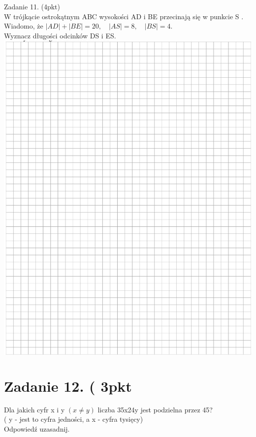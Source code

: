 \documentclass[10pt]{article}
\begin{document}
Zadanie 11. (4pkt)\\
W trójkącie ostrokątnym ABC wysokości AD i BE przecinają się w punkcie S .\\
Wiadomo, że \(|A D|+|B E|=20, \quad|A S|=8, \quad|B S|=4\).\\
Wyznacz długości odcinków DS i ES.\\
\includegraphics[max width=\textwidth, center]{2024_11_21_439e1d90cd1e7f928ae2g-09}

\section*{Zadanie 12. ( 3pkt}
Dla jakich cyfr x i y \((x \neq y)\) liczba 35x24y jest podzielna przez 45?\\
( y - jest to cyfra jedności, a x - cyfra tysięcy)\\
Odpowiedź uzasadnij.
\end{document}
